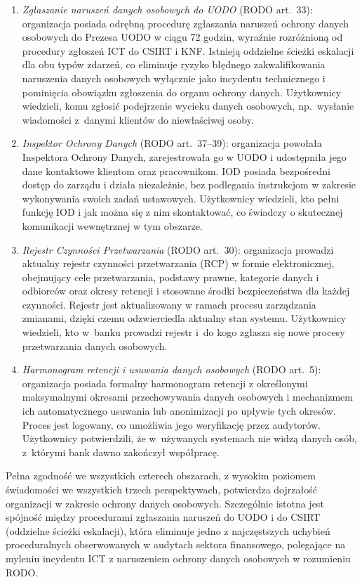   \begin{enumerate}[label=(\roman*)]
  \item \textit{Zgłaszanie naruszeń danych osobowych do UODO} (RODO art.~33): organizacja posiada odrębną procedurę zgłaszania naruszeń ochrony danych osobowych do Prezesa UODO w ciągu 72 godzin, wyraźnie rozróżnioną od procedury zgłoszeń ICT do CSIRT i KNF. Istnieją oddzielne ścieżki eskalacji dla obu typów zdarzeń, co eliminuje ryzyko błędnego zakwalifikowania naruszenia danych osobowych wyłącznie jako incydentu technicznego i pominięcia obowiązku zgłoszenia do organu ochrony danych. Użytkownicy wiedzieli, komu zgłosić podejrzenie wycieku danych osobowych, np.\ wysłanie wiadomości z~danymi klientów do niewłaściwej osoby.

  \item \textit{Inspektor Ochrony Danych} (RODO art.~37--39): organizacja powołała Inspektora Ochrony Danych, zarejestrowała go w UODO i udostępniła jego dane kontaktowe klientom oraz pracownikom. IOD posiada bezpośredni dostęp do zarządu i działa niezależnie, bez podlegania instrukcjom w zakresie wykonywania swoich zadań ustawowych. Użytkownicy wiedzieli, kto pełni funkcję IOD i jak można się z nim skontaktować, co świadczy o skutecznej komunikacji wewnętrznej w tym obszarze.

  \item \textit{Rejestr Czynności Przetwarzania} (RODO art.~30): organizacja prowadzi aktualny rejestr czynności przetwarzania (RCP) w formie elektronicznej, obejmujący cele przetwarzania, podstawy prawne, kategorie danych i odbiorców oraz okresy retencji i stosowane środki bezpieczeństwa dla każdej czynności. Rejestr jest aktualizowany w ramach procesu zarządzania zmianami, dzięki czemu odzwierciedla aktualny stan systemu. Użytkownicy wiedzieli, kto w~banku prowadzi rejestr i~do kogo zgłasza się nowe procesy przetwarzania danych osobowych.

  \item \textit{Harmonogram retencji i usuwania danych osobowych} (RODO art.~5): organizacja posiada formalny harmonogram retencji z określonymi maksymalnymi okresami przechowywania danych osobowych i mechanizmem ich automatycznego usuwania lub anonimizacji po upływie tych okresów. Proces jest logowany, co umożliwia jego weryfikację przez audytorów. Użytkownicy potwierdzili, że w~używanych systemach nie widzą danych osób, z~którymi bank dawno zakończył współpracę.
\end{enumerate}

Pełna zgodność we wszystkich czterech obszarach, z wysokim poziomem świadomości we wszystkich trzech perspektywach, potwierdza dojrzałość organizacji w zakresie ochrony danych osobowych. Szczególnie istotna jest spójność między procedurami zgłaszania naruszeń do UODO i do CSIRT (oddzielne ścieżki eskalacji), która eliminuje jedno z najczęstszych uchybień proceduralnych obserwowanych w audytach sektora finansowego, polegające na myleniu incydentu ICT z naruszeniem ochrony danych osobowych w rozumieniu RODO.

